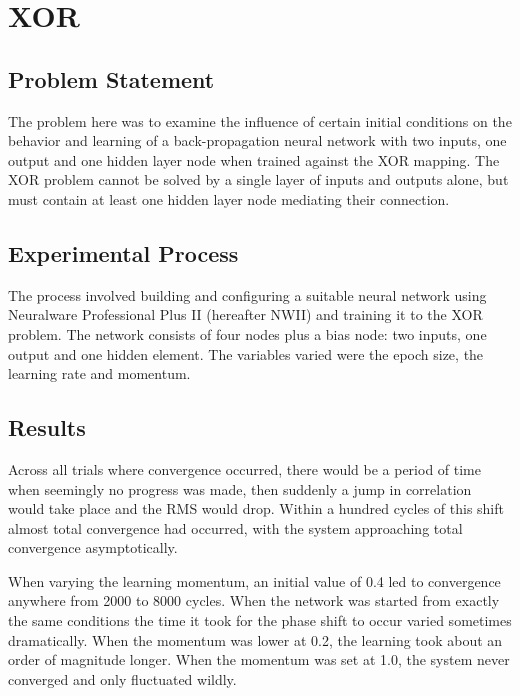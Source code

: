 \documentclass[12pt]{article}
\begin{document}
\maketitle

\section{XOR}

\subsection{Problem Statement}

The problem here was to examine the influence of certain initial conditions on the behavior and learning of a back-propagation neural network with two inputs, one output and one hidden layer node when trained against the XOR mapping.  The XOR problem cannot be solved by a single layer of inputs and outputs alone, but must contain at least one hidden layer node mediating their connection.  

\subsection{Experimental Process}

The process involved building and configuring a suitable neural network using Neuralware Professional Plus II (hereafter NWII) and training it to the XOR problem.  The network consists of four nodes plus a bias node: two inputs, one output and one hidden element.  The variables varied were the epoch size, the learning rate and momentum.

\subsection{Results}

Across all trials where convergence occurred, there would be a period of time when seemingly no progress was made, then suddenly a jump in correlation would take place and the RMS would drop.  Within a hundred cycles of this shift almost total convergence had occurred, with the system approaching total convergence asymptotically. 

When varying the learning momentum, an initial value of 0.4 led to convergence anywhere from 2000 to 8000 cycles.  When the network was started from exactly the same conditions the time it took for the phase shift to occur varied sometimes dramatically.  When the momentum was lower at 0.2, the learning took about an order of magnitude longer.  When the momentum was set at 1.0, the system never converged and only fluctuated wildly.  
\end{document}
